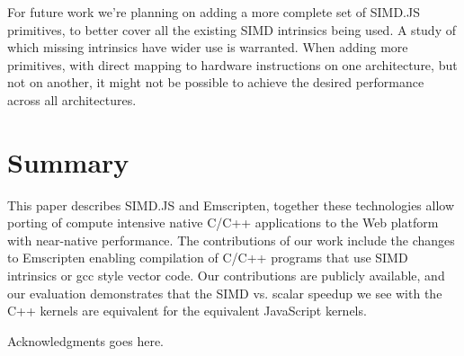 \documentclass[preprint]{sigplanconf}
\begin{document}
For future work we're planning on adding a more complete set of SIMD.JS primitives, to
better cover all the existing SIMD intrinsics being used.  A study of which missing intrinsics
have wider use is warranted.  When adding more primitives, with direct mapping to
hardware instructions on one architecture, but not on another, it might not be possible to
achieve the desired performance across all architectures.

\section{Summary}

This paper describes SIMD.JS and Emscripten, together these technologies allow 
porting of compute intensive native C/C++ applications to the Web platform
with near-native performance. The contributions of our work include the changes to
Emscripten enabling compilation of C/C++ programs that use
SIMD intrinsics or gcc style vector code. Our contributions are publicly available, and
our evaluation demonstrates that the SIMD vs. scalar speedup we see with the C++ kernels
are equivalent for the equivalent JavaScript kernels.
 
\acks

Acknowledgments goes here.


%






\end{document}
